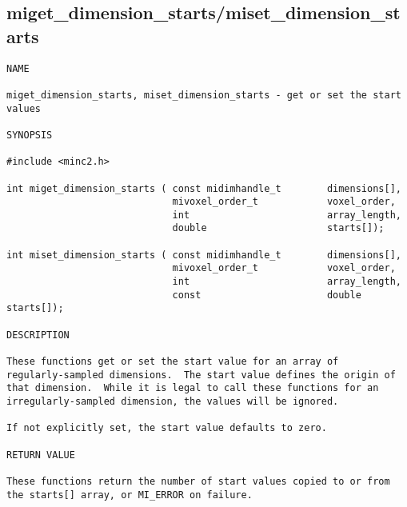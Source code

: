 \documentclass{article}
\begin{document}
\subsection{miget\_dimension\_starts/miset\_dimension\_starts}
\begin{verbatim}
NAME

miget_dimension_starts, miset_dimension_starts - get or set the start
values

SYNOPSIS

#include <minc2.h>

int miget_dimension_starts ( const midimhandle_t        dimensions[],
                             mivoxel_order_t            voxel_order,
                             int                        array_length,
                             double                     starts[]);
      
int miset_dimension_starts ( const midimhandle_t        dimensions[],
                             mivoxel_order_t            voxel_order,
                             int                        array_length,
                             const                      double starts[]);

DESCRIPTION

These functions get or set the start value for an array of
regularly-sampled dimensions.  The start value defines the origin of
that dimension.  While it is legal to call these functions for an
irregularly-sampled dimension, the values will be ignored.

If not explicitly set, the start value defaults to zero.

RETURN VALUE

These functions return the number of start values copied to or from
the starts[] array, or MI_ERROR on failure.
\end{verbatim}
\end{document}

